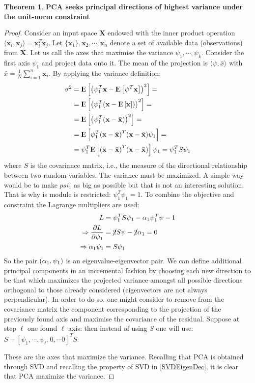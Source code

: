 \documentclass[12pt, letterpaper]{article}
\theoremstyle{definition}
\newcommand{\E}{{\rm I\kern-.3em E}}
\newcommand{\X}{\mathrm{\mathbf{X}}}
\newcommand{\x}{\mathbf{x}}
\DeclarePairedDelimiter\autobracket{(}{)}
\newcommand{\br}[1]{\autobracket*{#1}}
\newtheorem{theorem}{Theorem}
\let\tb\textbf
\begin{document}
\begin{theorem}{\tb{PCA seeks principal directions of highest variance under the unit-norm constraint}}
\label{PCAmaxVar}
\begin{proof}
Consider an input space $\X$ endowed with the inner product operation $\langle \x_i, \x_j\rangle = \x_i^T \x_j$. Let $\{\x_1\}, \x_2, \cdots, \x_n$ denote a set of available data (observations) from $\X$. Let us call the axes that maximise the variance $\psi_1, \cdots, \psi_k$. Consider the first axis $\psi_1$ and project data onto it. The mean of the projection is $\langle \psi, \bar{x}\rangle$ with $\bar{x} = \frac{1}{N} \sum_{i=1}^n \x_i$.
By applying the variance definition:
\begin{equation}
\begin{aligned}
\sigma^2 &= \E\left[ \br{\psi_1^T\x -\E\left[ \psi^T\x\right]}^2 \right] = \\
&= \E\left[ \br{\psi_1^T\br{\x - \E\left[\x\right]}}^2 \right] = \\
&= \E\left[ \br{\psi_1^T\br{\x - \bar{\x}}}^2 \right] = \\
&= \E\left[ \psi_1^T\br{\x - \bar{\x}}^T\br{\x - \bar{\x}}\psi_1 \right] = \\
&= \psi_1^T\E\left[ \br{\x - \bar{\x}}^T\br{\x - \bar{\x}} \right]\psi_1  =\psi_1^T S \psi_1 
\end{aligned}
\end{equation}
where $S$ is the covariance matrix, i.e., the measure of the directional relationship between two random variables.
The variance must be maximized. A simple way would be to make $psi_1$ as big as possible but that is not an interesting solution. That is why is module is restricted: $\psi_1^T \psi_1=1$. To combine the objective and constraint the Lagrange multipliers are used:
\begin{equation}
\begin{aligned}
L &= \psi_1^T S \psi_1  - \alpha_1 \psi_1^T \psi -1\\
\Rightarrow \frac{\partial L}{\partial \psi_1} &= \cancel{2}S \psi -\cancel{2} \alpha_1 = 0\\
\Rightarrow \alpha_1 \psi_1 &= S \psi_1
\end{aligned}
\end{equation}
So the pair $\br{\alpha_1, \psi_1}$ is an eigenvalue-eigenvector pair. We can define additional principal components in an incremental fashion by choosing each new direction to be that which maximizes the projected variance amongst all possible directions orthogonal to those already considered (eigenvectors are not always perpendicular). In order to do so, one might consider to remove from the covariance matrix the component corresponding to the projection of the previously found axis and maximise the covariance of the residual. Suppose at step $\ell$ one found $\ell$ axis: then instead of using $S$ one will use: $S-[\psi_1, \cdots, \psi_\ell, 0, \cdots 0]^T S$.

These are the axes that maximize the variance. Recalling that PCA is obtained through SVD and recalling the property of SVD in \autoref{SVDEigenDec}, it is clear that PCA maximize the variance.
\end{proof}
\end{theorem}
\end{document}
